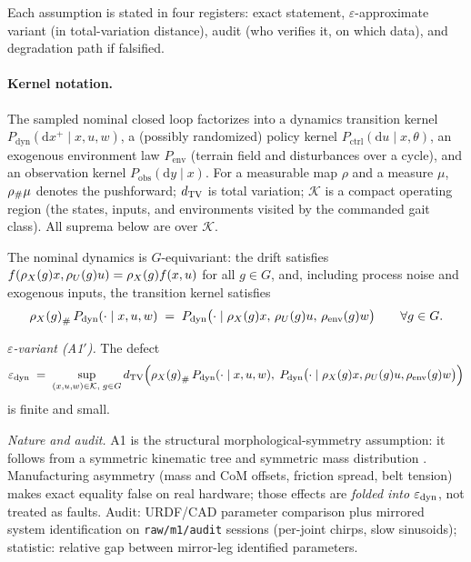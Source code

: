 Each assumption is stated in four registers: exact statement,
$\varepsilon$-approximate variant (in total-variation distance), audit (who
verifies it, on which data), and degradation path if falsified.

\paragraph{Kernel notation.}
The sampled nominal closed loop factorizes into a dynamics transition kernel
$P_{\mathrm{dyn}}(\mathrm{d}x^+ \mid x, u, w)$, a (possibly randomized) policy
kernel $P_{\mathrm{ctrl}}(\mathrm{d}u \mid x, \theta)$, an exogenous
environment law $P_{\mathrm{env}}$ (terrain field and disturbances over a
cycle), and an observation kernel $P_{\mathrm{obs}}(\mathrm{d}y \mid x)$. For
a measurable map $\rho$ and a measure $\mu$, ${\rho}_{\#}\mu$ denotes the
pushforward; $d_{\mathrm{TV}}$ is total variation; $\mathcal{K}$ is a compact operating
region (the states, inputs, and environments visited by the commanded gait
class). All suprema below are over $\mathcal{K}$.

\begin{assumption}
\label{as:dyn}
The nominal dynamics is $G$-equivariant: the drift satisfies
$f(\rho_{X}(g)x, \rho_{U}(g)u) = \rho_{X}(g) f(x,u)$ for all $g \in G$, and, including
process noise and exogenous inputs, the transition kernel satisfies
\[
  {\rho_{X}(g)}_{\#}\, P_{\mathrm{dyn}}(\cdot \mid x, u, w)
  \;=\;
  P_{\mathrm{dyn}}\bigl(\cdot \mid \rho_{X}(g)x,\, \rho_{U}(g)u,\, \rho_{\mathrm{env}}(g)w\bigr)
  \qquad \forall g \in G .
\]
\end{assumption}

\emph{$\varepsilon$-variant (A1$'$).} The defect
\[
  \varepsilon_{\mathrm{dyn}}
  \;=\;
  \sup_{(x,u,w) \in \mathcal{K},\; g \in G}
  d_{\mathrm{TV}}\Bigl(
    {\rho_{X}(g)}_{\#}\, P_{\mathrm{dyn}}(\cdot \mid x,u,w),\;
    P_{\mathrm{dyn}}\bigl(\cdot \mid \rho_{X}(g)x, \rho_{U}(g)u, \rho_{\mathrm{env}}(g)w\bigr)
  \Bigr)
\]
is finite and small.

\emph{Nature and audit.} A1 is the structural morphological-symmetry
assumption: it follows from a symmetric kinematic tree and symmetric mass
distribution \cite{ordonez2023discrete,ordonez2025morphological}.
Manufacturing asymmetry (mass and CoM offsets, friction spread, belt tension)
makes exact equality false on real hardware; those effects are \emph{folded
into $\varepsilon_{\mathrm{dyn}}$}, not treated as faults. Audit: URDF/CAD parameter
comparison plus mirrored system identification on \texttt{raw/m1/audit}
sessions (per-joint chirps, slow sinusoids); statistic: relative gap between
mirror-leg identified parameters.

